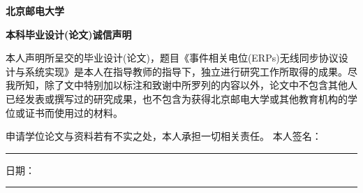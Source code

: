\begin{center}
\textbf{\songti{}北京邮电大学}  
\end{center}

\begin{center}
\textbf{\songti{} 本科毕业设计(论文)诚信声明}
\end{center}
\songti{}

本人声明所呈交的毕业设计(论文)，题目《事件相关电位(ERPs)无线同步协议设计与系统实现》是本人在指导教师的指导下，独立进行研究工作所取得的成果。尽我所知，除了文中特别加以标注和致谢中所罗列的内容以外，论文中不包含其他人已经发表或撰写过的研究成果，也不包含为获得北京邮电大学或其他教育机构的学位或证书而使用过的材料。

申请学位论文与资料若有不实之处，本人承担一切相关责任。  \newline
\indent 本人签名：\rule[-2pt]{4cm}{0.5pt}\quad 日期：\rule[-2pt]{4cm}{0.5pt}


